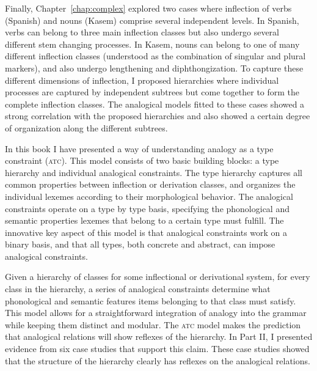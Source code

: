 Finally, Chapter~\ref{chap:complex} explored two cases where inflection of verbs (Spanish) and nouns (Kasem) comprise several independent levels.
In Spanish, verbs can belong to three main inflection classes but also undergo several different stem changing processes.
In Kasem, nouns can belong to one of many different inflection classes (understood as the combination of singular and plural markers), and also undergo lengthening and diphthongization.
To capture these different dimensions of inflection, I proposed hierarchies where individual processes are captured by independent subtrees but come together to form the complete inflection classes.
The analogical models fitted to these cases showed a strong correlation with the proposed hierarchies and also showed a certain degree of organization along the different subtrees.

In this book I have presented a way of understanding analogy as a type constraint (\textsc{atc}).
This model consists of two basic building blocks: a type hierarchy and individual analogical constraints.
The type hierarchy captures all common properties between inflection or derivation classes, and organizes the individual lexemes according to their morphological behavior.
The analogical constraints operate on a type by type basis, specifying the phonological and semantic properties lexemes that belong to a certain type must fulfill.
The innovative key aspect of this model is that analogical constraints work on a binary basis, and that all types, both concrete and abstract, can impose analogical constraints.

Given a hierarchy of classes for some inflectional or derivational system, for every class in the hierarchy, a series of analogical constraints determine what phonological and semantic features items belonging to that class must satisfy.
This model allows for a straightforward integration of analogy into the grammar while keeping them distinct and modular.
The \textsc{atc} model makes the prediction that analogical relations will show reflexes of the hierarchy. In Part II, I presented evidence from six case studies that support this claim.
These case studies showed that the structure of the hierarchy clearly has reflexes on the analogical relations.

